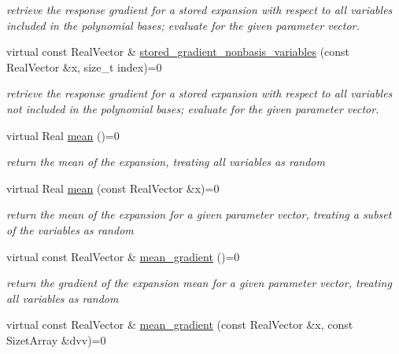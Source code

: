 \begin{DoxyCompactItemize}
\begin{DoxyCompactList}\small\item\em retrieve the response gradient for a stored expansion with respect to all variables included in the polynomial bases; evaluate for the given parameter vector. \end{DoxyCompactList}\item 
virtual const Real\+Vector \& \hyperlink{classPecos_1_1PolynomialApproximation_a03d14a5cdff18a4c1d67f12a575d8eb6}{stored\+\_\+gradient\+\_\+nonbasis\+\_\+variables} (const Real\+Vector \&x, size\+\_\+t index)=0\label{classPecos_1_1PolynomialApproximation_a03d14a5cdff18a4c1d67f12a575d8eb6}

\begin{DoxyCompactList}\small\item\em retrieve the response gradient for a stored expansion with respect to all variables not included in the polynomial bases; evaluate for the given parameter vector. \end{DoxyCompactList}\item 
virtual Real \hyperlink{classPecos_1_1PolynomialApproximation_ae748f0525197363b2279cd36511fb791}{mean} ()=0\label{classPecos_1_1PolynomialApproximation_ae748f0525197363b2279cd36511fb791}

\begin{DoxyCompactList}\small\item\em return the mean of the expansion, treating all variables as random \end{DoxyCompactList}\item 
virtual Real \hyperlink{classPecos_1_1PolynomialApproximation_a69da68e2a4dd4b51439150ebfe4dc239}{mean} (const Real\+Vector \&x)=0\label{classPecos_1_1PolynomialApproximation_a69da68e2a4dd4b51439150ebfe4dc239}

\begin{DoxyCompactList}\small\item\em return the mean of the expansion for a given parameter vector, treating a subset of the variables as random \end{DoxyCompactList}\item 
virtual const Real\+Vector \& \hyperlink{classPecos_1_1PolynomialApproximation_abcb01df2fc2d4c44bab6b56ad7def50c}{mean\+\_\+gradient} ()=0\label{classPecos_1_1PolynomialApproximation_abcb01df2fc2d4c44bab6b56ad7def50c}

\begin{DoxyCompactList}\small\item\em return the gradient of the expansion mean for a given parameter vector, treating all variables as random \end{DoxyCompactList}\item 
virtual const Real\+Vector \& \hyperlink{classPecos_1_1PolynomialApproximation_a941461d09fc3c204012a12ceda5cfdde}{mean\+\_\+gradient} (const Real\+Vector \&x, const Sizet\+Array \&dvv)=0\label{classPecos_1_1PolynomialApproximation_a941461d09fc3c204012a12ceda5cfdde}


\end{DoxyCompactItemize}

